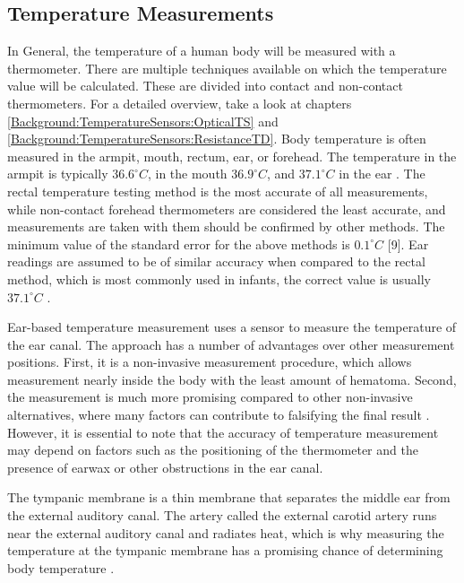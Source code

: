 \subsection{Temperature Measurements}
\label{Background:BodyTemperature:TemperatureMeasurements}
In General, the temperature of a human body will be measured with a thermometer.
There are multiple techniques available on which the temperature value will be calculated. 
These are divided into contact and non-contact thermometers.
For a detailed overview, take a look at chapters \ref{Background:TemperatureSensors:OpticalTS} and \ref{Background:TemperatureSensors:ResistanceTD}.
Body temperature is often measured in the armpit, mouth, rectum, ear, or forehead.
The temperature in the armpit is typically $36.6^\circ C$, in the mouth $36.9^\circ C$, and $37.1^\circ C$ in the ear \cite{dolibogComparativeAnalysisHuman2022}.
The rectal temperature testing method is the most accurate of all measurements, while non-contact forehead thermometers are considered the least accurate, and measurements are taken with them should be confirmed by other methods.
The minimum value of the standard error for the above methods is $0.1^\circ C$ [9].
Ear readings are assumed to be of similar accuracy when compared to the rectal method, which is most commonly used in infants, the correct value is usually $37.1^\circ C$ \cite{dolibogComparativeAnalysisHuman2022}.

Ear-based temperature measurement uses a sensor to measure the temperature of the ear canal. 
The approach has a number of advantages over other measurement positions.
First, it is a non-invasive measurement procedure, which allows measurement nearly inside the body with the least amount of hematoma.
Second, the measurement is much more promising compared to other non-invasive alternatives, where many factors can contribute to falsifying the final result \cite{ganioValidityReliabilityDevices2009, craigTemperatureMeasuredAxilla2000}. 
However, it is essential to note that the accuracy of temperature measurement may depend on factors such as the positioning of the thermometer and the presence of earwax or other obstructions in the ear canal.

The tympanic membrane is a thin membrane that separates the middle ear from the external auditory canal. 
The artery called the external carotid artery runs near the external auditory canal and radiates heat, which is why measuring the temperature at the tympanic membrane has a promising chance of determining body temperature \cite{yeohRevisitingTympanicMembrane2017}.

